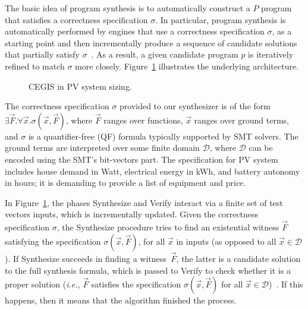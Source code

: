 \documentclass[journal]{IEEEtran}
\begin{document}
The basic idea of program synthesis is to automatically construct a $P$ program that satisfies a correctness specification $\sigma$. In particular, program synthesis is automatically performed by engines that use a correctness specification $\sigma$, as a starting point and then incrementally produce a sequence of candidate solutions that partially satisfy $\sigma$~\cite{Abateetal2017}. As a result, a given candidate program $p$ is iteratively refined to match $\sigma$ more closely. Figure~\ref{Counter-Example-Guided-Inductive-Synthesis} illustrates the underlying architecture. 
%
\begin{figure}[ht]
\begin{center}
\end{center}
	\caption{CEGIS in PV system sizing.}
	\label{Counter-Example-Guided-Inductive-Synthesis}
\end{figure}

The correctness specification $\sigma$ provided to our synthesizer is of the form $\exists \vec{F}. \forall \vec{x}. \sigma(\vec{x}, \vec{F})$, where $\vec{F}$ ranges over functions, $\vec{x}$ ranges over ground terms, and $\sigma$ is a quantifier-free (QF) formula typically supported by SMT solvers. The ground terms are interpreted over some finite domain $\mathcal{D}$, where $\mathcal{D}$ can be encoded using the SMT's bit-vectors part. The specification for PV system includes house demand in Watt, electrical energy in kWh, and battery autonomy in hours; it is demanding to provide a list of equipment and price.

In Figure~\ref{Counter-Example-Guided-Inductive-Synthesis}, the phases {\sc Synthesize} and {\sc Verify} interact via a finite set of test vectors {\sc inputs}, which is incrementally updated. Given the correctness specification $\sigma$, the {\sc Synthesize} procedure tries to find an existential witness $\vec{F}$ satisfying the specification $\sigma(\vec{x}, \vec{F})$, for all $\vec{x}$ in {\sc inputs} (as opposed to all $\vec{x} \in \mathcal{D}$). If {\sc Synthesize} succeeds in finding a witness~$\vec{F}$, the latter is a candidate solution to the full synthesis formula, which is passed to {\sc Verify} to check whether it is a proper solution ({\it i.e.}, $\vec{F}$ satisfies the specification $\sigma(\vec{x}, \vec{F})$ for all $\vec{x}\in\mathcal{D}$)~\cite{iet-cps.2018.5006}. If this happens, then it means that the algorithm finished the process. 
\end{document}
